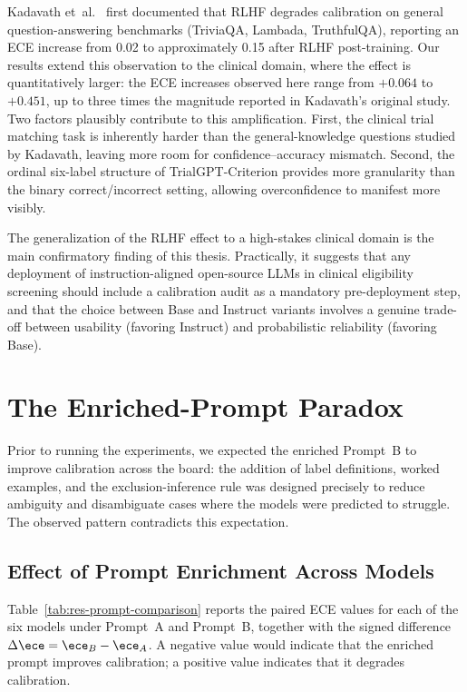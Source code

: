 Kadavath et~al.~\cite{kadavath2022know} first documented that RLHF 
degrades calibration on general question-answering benchmarks (TriviaQA, 
Lambada, TruthfulQA), reporting an ECE increase from 0.02 to approximately 
0.15 after RLHF post-training. Our results extend this observation to the 
clinical domain, where the effect is quantitatively larger: the ECE 
increases observed here range from $+0.064$ to $+0.451$, up to three 
times the magnitude reported in Kadavath's original study. Two factors 
plausibly contribute to this amplification. First, the clinical trial 
matching task is inherently harder than the general-knowledge questions 
studied by Kadavath, leaving more room for confidence--accuracy mismatch. 
Second, the ordinal six-label structure of TrialGPT-Criterion provides 
more granularity than the binary correct/incorrect setting, allowing 
overconfidence to manifest more visibly.

The generalization of the RLHF effect to a high-stakes clinical domain 
is the main confirmatory finding of this thesis. Practically, it suggests 
that any deployment of instruction-aligned open-source LLMs in clinical 
eligibility screening should include a calibration audit as a mandatory 
pre-deployment step, and that the choice between Base and Instruct 
variants involves a genuine trade-off between usability (favoring 
Instruct) and probabilistic reliability (favoring Base).
\section{The Enriched-Prompt Paradox}
\label{sec:res-prompt}

Prior to running the experiments, we expected the enriched Prompt~B to 
improve calibration across the board: the addition of label definitions, 
worked examples, and the exclusion-inference rule was designed precisely 
to reduce ambiguity and disambiguate cases where the models were 
predicted to struggle. The observed pattern contradicts this expectation.

\subsection{Effect of Prompt Enrichment Across Models}
\label{subsec:res-prompt-comparison}

Table~\ref{tab:res-prompt-comparison} reports the paired ECE values for 
each of the six models under Prompt~A and Prompt~B, together with the 
signed difference $\Delta\ece = \ece_B - \ece_A$. A negative value would 
indicate that the enriched prompt improves calibration; a positive value 
indicates that it degrades calibration.

